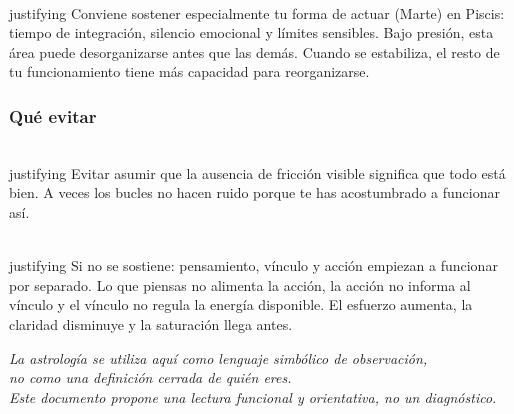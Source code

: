 \documentclass[11pt,a4paper]{article}
\begin{document}
\\justifying
Conviene sostener especialmente tu forma de actuar (Marte) en Piscis: tiempo de integración, silencio emocional y límites sensibles. Bajo presión, esta área puede desorganizarse antes que las demás. Cuando se estabiliza, el resto de tu funcionamiento tiene más capacidad para reorganizarse.

\subsubsection*{Qué evitar}

\\justifying
Evitar asumir que la ausencia de fricción visible significa que todo está bien. A veces los bucles no hacen ruido porque te has acostumbrado a funcionar así.

\vspace{0.6cm}

\\justifying
Si no se sostiene: pensamiento, vínculo y acción empiezan a funcionar por separado. Lo que piensas no alimenta la acción, la acción no informa al vínculo y el vínculo no regula la energía disponible. El esfuerzo aumenta, la claridad disminuye y la saturación llega antes.

\vspace{1.2cm}

\begin{center}
{\small\itshape\color{grisai}
La astrología se utiliza aquí como lenguaje simbólico de observación,\\
no como una definición cerrada de quién eres.\\[0.2cm]
Este documento propone una lectura funcional y orientativa, no un diagnóstico.
}
\end{center}
\end{document}
